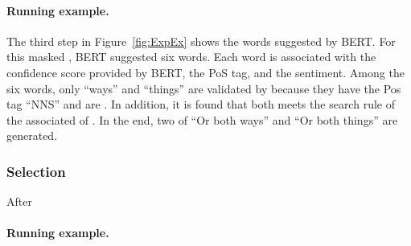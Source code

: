\paragraph{Running example.} The third step in Figure~\ref{fig:ExpEx} shows the words suggested
by BERT. For this masked \sent, BERT suggested six words. Each word
is associated with the confidence score provided by BERT, the PoS tag,
and the sentiment. Among the six words, only ``ways'' and ``things''
are validated by \tool{} because they have the Pos tag ``NNS'' and are
\neu. In addition, it is found that both \sents meets the search
rule of the associated \lc of \SareqExOne. In the end, two \sents
of ``Or both ways'' and ``Or both things'' are generated.  


\subsubsection{\Sent Selection}
After 
\paragraph{Running example.}  
